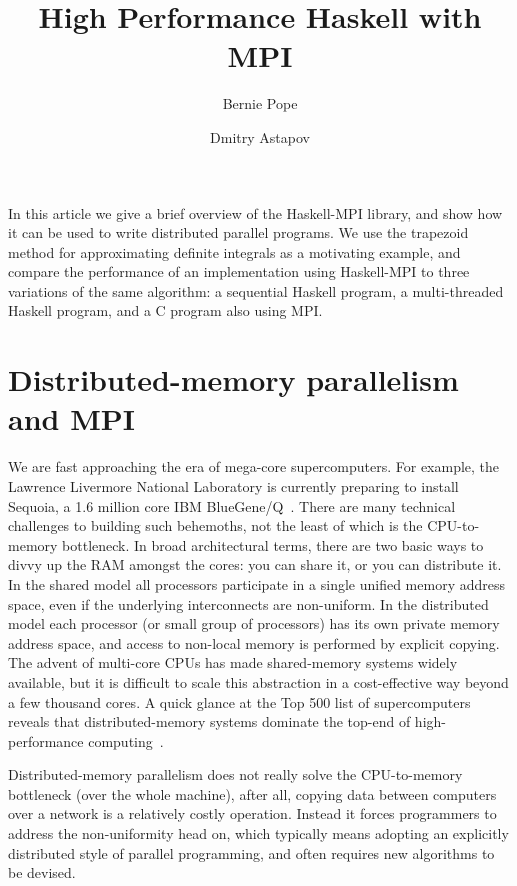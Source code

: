 \documentclass{tmr}
\title{High Performance Haskell with MPI}
\author{Bernie Pope\email{bjpope@unimelb.edu.au}}
\author{Dmitry Astapov\email{dastapov@gmail.com}}
\begin{document}
\begin{introduction}
In this article we give a brief overview of the Haskell-MPI library, and show how it can be used to write distributed
parallel programs. We use the trapezoid method for approximating definite integrals as a motivating example,
and compare the performance of an implementation using Haskell-MPI to three variations of the same algorithm: a sequential
Haskell program, a multi-threaded Haskell program, and a C program also using MPI.
\end{introduction}

\section{Distributed-memory parallelism and MPI}

We are fast approaching the era of mega-core
supercomputers. For example, the Lawrence Livermore National Laboratory
is currently preparing to install Sequoia, a 1.6 million core IBM
BlueGene/Q~\cite{Sequoia}. There are many technical
challenges to building such behemoths, not the least of which is
the CPU-to-memory bottleneck. In broad architectural terms, there are two basic ways to
divvy up the RAM amongst the cores: you can share it, or you can distribute it.
In the shared model all processors participate in a single unified memory address space, even if
the underlying interconnects are non-uniform. In the distributed model each processor (or small group
of processors) has its own private memory address space, and access to non-local memory is
performed by explicit copying. The advent of multi-core CPUs has made shared-memory systems
widely available, but it is difficult to scale this abstraction in a
cost-effective way beyond a few thousand cores. A quick glance at the Top 500 list of supercomputers reveals
that distributed-memory systems dominate the top-end of high-performance computing~\cite{top-500}.

Distributed-memory parallelism does not really solve the CPU-to-memory bottleneck (over the whole machine),
after all, copying data between computers over a network is a relatively costly operation.
Instead it forces programmers to
address the non-uniformity head on, which typically means adopting an explicitly distributed style of
parallel programming, and often requires new algorithms to be devised.
\end{document}
